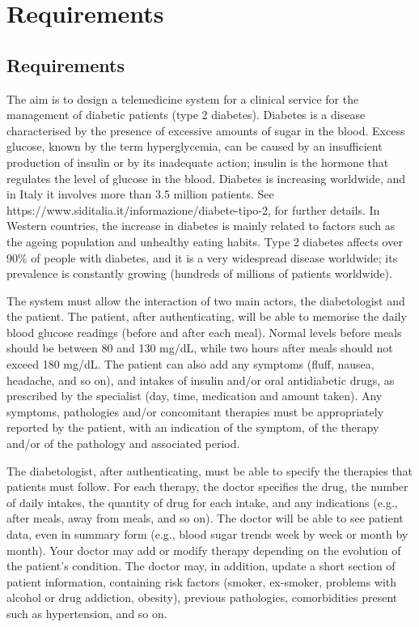 \documentclass[10pt, titlepage]{article}
\begin{document}
    \newpage
    \tableofcontents{}
    
    \newpage
    \section{Requirements}
    \label{sec:requirements}
    \subsection{Requirements}
    The aim is to design a telemedicine system for a clinical service for the management of diabetic patients (type 2 diabetes). Diabetes is a disease characterised by the presence of excessive amounts of sugar in the blood. Excess glucose, known by the term hyperglycemia, can be caused by an insufficient production of insulin or by its inadequate action; insulin is the hormone that regulates the level of glucose in the blood. Diabetes is increasing worldwide, and in Italy it involves more than 3.5 million patients. See https://www.siditalia.it/informazione/diabete-tipo-2, for further details. In Western countries, the increase in diabetes is mainly related to factors such as the ageing population and unhealthy eating habits. Type 2 diabetes affects over 90\% of people with diabetes, and it is a very widespread disease worldwide; its prevalence is constantly growing (hundreds of millions of patients worldwide).

    The system must allow the interaction of two main actors, the diabetologist and the patient. The patient, after authenticating, will be able to memorise the daily blood glucose readings (before and after each meal).  Normal levels before meals should be between 80 and 130 mg/dL, while two hours after meals should not exceed 180 mg/dL. The patient can also add any symptoms (fluff, nausea, headache, and so on), and intakes of insulin and/or oral antidiabetic drugs, as prescribed by the specialist (day, time, medication and amount taken). Any symptoms, pathologies and/or concomitant therapies must be appropriately reported by the patient, with an indication of the symptom, of the therapy and/or of the pathology and associated period.

    The diabetologist, after authenticating, must be able to specify the therapies that patients must follow. For each therapy, the doctor specifies the drug, the number of daily intakes, the quantity of drug for each intake, and any indications (e.g., after meals, away from meals, and so on). The doctor will be able to see patient data, even in summary form (e.g., blood sugar trends week by week or month by month). Your doctor may add or modify therapy depending on the evolution of the patient's condition. The doctor may, in addition, update a short section of patient information, containing risk factors (smoker, ex-smoker, problems with alcohol or drug addiction, obesity), previous pathologies, comorbidities present such as hypertension, and so on.
\end{document}

